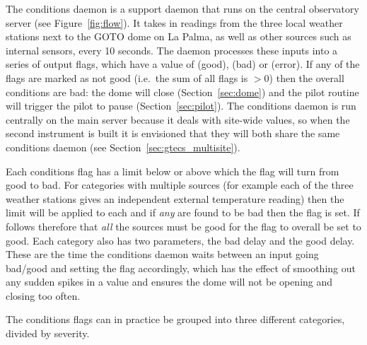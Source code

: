 \begin{colsection}
\begin{colsection}
The conditions daemon is a support daemon that runs on the central observatory server (see Figure~\ref{fig:flow}). It takes in readings from the three local weather stations next to the GOTO dome on La Palma, as well as other sources such as internal sensors, every 10 seconds. The daemon processes these inputs into a series of output flags, which have a value of  (good),  (bad) or  (error). If any of the flags are marked as not good (i.e.\ the sum of all flags is $>0$) then the overall conditions are bad: the dome will close (Section~\ref{sec:dome}) and the pilot  routine will trigger the pilot to pause (Section~\ref{sec:pilot}). The conditions daemon is run centrally on the main server because it deals with site-wide values, so when the second instrument is built it is envisioned that they will both share the same conditions daemon (see Section~\ref{sec:gtecs_multisite}).

Each conditions flag has a limit below or above which the flag will turn from good to bad. For categories with multiple sources (for example each of the three weather stations gives an independent external temperature reading) then the limit will be applied to each and if \textit{any} are found to be bad then the flag is set. If follows therefore that \textit{all} the sources must be good for the flag to overall be set to good. Each category also has two parameters, the bad delay and the good delay. These are the time the conditions daemon waits between an input going bad/good and setting the flag accordingly, which has the effect of smoothing out any sudden spikes in a value and ensures the dome will not be opening and closing too often.

The conditions flags can in practice be grouped into three different categories, divided by severity.


\end{colsection}
\end{colsection}
